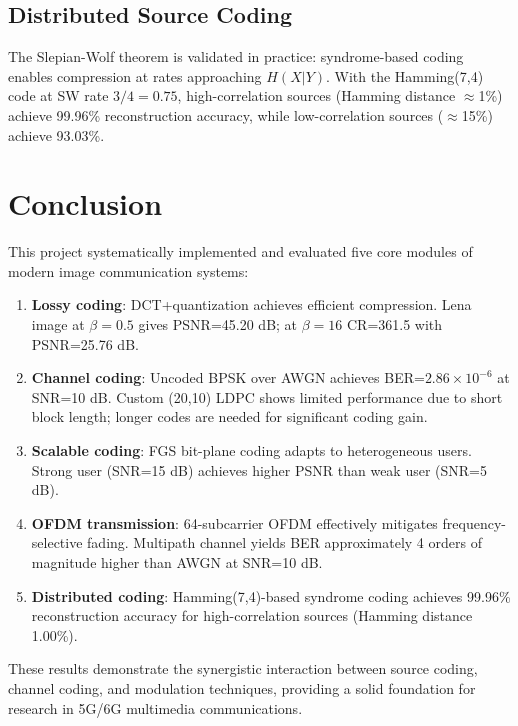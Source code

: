 \documentclass[12pt, a4paper]{article}
\begin{document}
\subsection{Distributed Source Coding}

The Slepian-Wolf theorem is validated in practice: syndrome-based coding enables compression at rates approaching $H(X|Y)$. With the Hamming(7,4) code at SW rate $3/4=0.75$, high-correlation sources (Hamming distance $\approx$1\%) achieve 99.96\% reconstruction accuracy, while low-correlation sources ($\approx$15\%) achieve 93.03\%.

\section{Conclusion}

This project systematically implemented and evaluated five core modules of modern image communication systems:

\begin{enumerate}
    \item \textbf{Lossy coding}: DCT+quantization achieves efficient compression. Lena image at $\beta=0.5$ gives PSNR=45.20 dB; at $\beta=16$ CR=361.5 with PSNR=25.76 dB.
    \item \textbf{Channel coding}: Uncoded BPSK over AWGN achieves BER=$2.86\times10^{-6}$ at SNR=10 dB. Custom (20,10) LDPC shows limited performance due to short block length; longer codes are needed for significant coding gain.
    \item \textbf{Scalable coding}: FGS bit-plane coding adapts to heterogeneous users. Strong user (SNR=15 dB) achieves higher PSNR than weak user (SNR=5 dB).
    \item \textbf{OFDM transmission}: 64-subcarrier OFDM effectively mitigates frequency-selective fading. Multipath channel yields BER approximately 4 orders of magnitude higher than AWGN at SNR=10 dB.
    \item \textbf{Distributed coding}: Hamming(7,4)-based syndrome coding achieves 99.96\% reconstruction accuracy for high-correlation sources (Hamming distance 1.00\%).
\end{enumerate}

These results demonstrate the synergistic interaction between source coding, channel coding, and modulation techniques, providing a solid foundation for research in 5G/6G multimedia communications.
\end{document}
